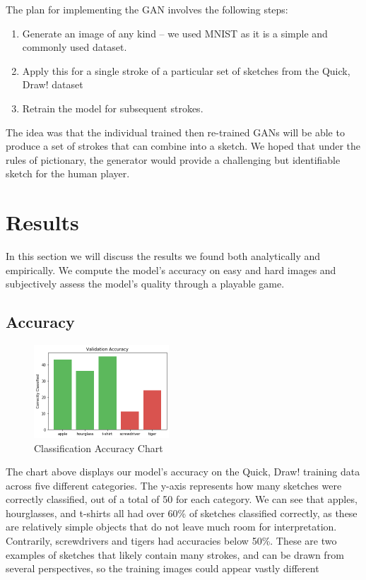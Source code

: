\documentclass[10pt,twocolumn,letterpaper]{article}
\begin{document}
The plan for implementing the GAN involves the following steps:
\begin{enumerate}
  \item Generate an image of any kind – we used MNIST as it is a simple and commonly used dataset. 
  \item Apply this for a single stroke of a particular set of sketches from the Quick, Draw! dataset
  \item Retrain the model for subsequent strokes.
\end{enumerate}

The idea was that the individual trained then re-trained GANs will be able to produce a set of strokes that can combine into a sketch. We hoped that under the rules of pictionary, the generator would provide a challenging but identifiable sketch for the human player.

\section{Results}

In this section we will discuss the results we found both analytically and empirically. We compute the model’s accuracy on easy and hard images and subjectively assess the model’s quality through a playable game.

\subsection{Accuracy}

\begin{figure}[H]
  \centering
  \includegraphics[width=0.45\textwidth]{accuracy.png}
  \caption{Classification Accuracy Chart}
\end{figure}

The chart above displays our model’s accuracy on the Quick, Draw! training data across five different categories. The y-axis represents how many sketches were correctly classified, out of a total of 50 for each category. We can see that apples, hourglasses, and t-shirts all had over 60\% of sketches classified correctly, as these are relatively simple objects that do not leave much room for interpretation. Contrarily, screwdrivers and tigers had accuracies below 50\%. These are two examples of sketches that likely contain many strokes, and can be drawn from several perspectives, so the training images could appear vastly different
\end{document}
